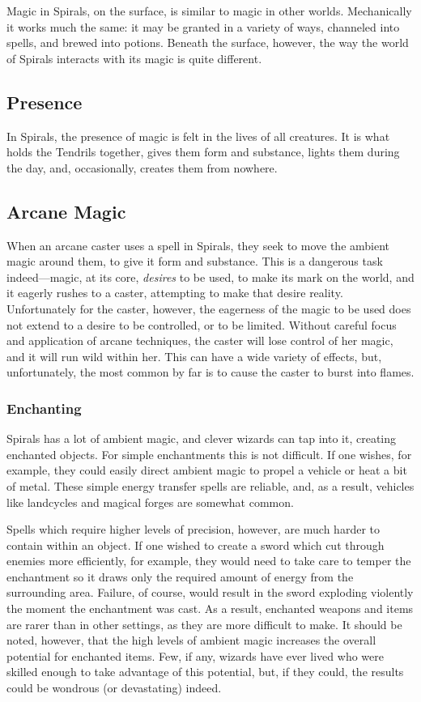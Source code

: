 

Magic in Spirals, on the surface, is similar to magic in other worlds.
Mechanically it works much the same: it may be granted in a variety of ways, channeled into spells, and brewed into potions.
Beneath the surface, however, the way the world of Spirals interacts with its magic is quite different.

\begin{multicols}{2}
\subsection{Presence}
In Spirals, the presence of magic is felt in the lives of all creatures.
It is what holds the Tendrils together, gives them form and substance, lights them during the day, and, occasionally, creates them from nowhere.

\subsection{Arcane Magic}
When an arcane caster uses a spell in Spirals, they seek to move the ambient magic around them, to give it form and substance.
This is a dangerous task indeed---magic, at its core, \textit{desires} to be used, to make its mark on the world, and it eagerly rushes to a caster, attempting to make that desire reality.
Unfortunately for the caster, however, the eagerness of the magic to be used does not extend to a desire to be controlled, or to be limited.
Without careful focus and application of arcane techniques, the caster will lose control of her magic, and it will run wild within her.
This can have a wide variety of effects, but, unfortunately, the most common by far is to cause the caster to burst into flames.

\subsubsection{Enchanting}
Spirals has a lot of ambient magic, and clever wizards can tap into it, creating enchanted objects.
For simple enchantments this is not difficult.
If one wishes, for example, they could easily direct ambient magic to propel a vehicle or heat a bit of metal.
These simple energy transfer spells are reliable, and, as a result, vehicles like landcycles and magical forges are somewhat common.

Spells which require higher levels of precision, however, are much harder to contain within an object.
If one wished to create a sword which cut through enemies more efficiently, for example, they would need to take care to temper the enchantment so it draws only the required amount of energy from the surrounding area.
Failure, of course, would result in the sword exploding violently the moment the enchantment was cast.
As a result, enchanted weapons and items are rarer than in other settings, as they are more difficult to make.
It should be noted, however, that the high levels of ambient magic increases the overall potential for enchanted items.
Few, if any, wizards have ever lived who were skilled enough to take advantage of this potential, but, if they could, the results could be wondrous (or devastating) indeed.


\end{multicols}

